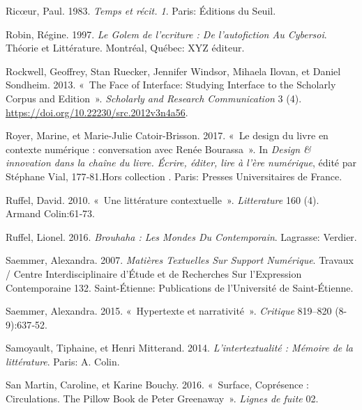 \begin{CSLReferences}{1}{0}
\leavevmode{}%
Ricœur, Paul. 1983. \emph{{Temps et r{é}cit. 1}}. {Paris}: {{É}ditions
du Seuil}.

\leavevmode{}%
Robin, Régine. 1997. \emph{Le {Golem} de l'ecriture : De l'autofiction
Au Cybersoi}. Th{é}orie et Litt{é}rature. {Montr{é}al, Qu{é}bec}: {XYZ
{é}diteur}.

\leavevmode{}%
Rockwell, Geoffrey, Stan Ruecker, Jennifer Windsor, Mihaela Ilovan, et
Daniel Sondheim. 2013. {«~The {Face} of {Interface}: {Studying
Interface} to the {Scholarly Corpus} and {Edition}~»}. \emph{Scholarly
and Research Communication} 3 (4).
\url{https://doi.org/10.22230/src.2012v3n4a56}.

\leavevmode{}%
Royer, Marine, et Marie-Julie Catoir-Brisson. 2017. {«~{Le design du
livre en contexte num{é}rique : conversation avec Ren{é}e Bourassa}~»}.
In \emph{{Design \& innovation dans la cha{î}ne du livre. {É}crire,
{é}diter, lire {à} l'{è}re num{é}rique}}, édité par Stéphane Vial,
177‑81.{{\guillemotleft}Hors collection {\guillemotright}}. {Paris}:
{Presses Universitaires de France}.

\leavevmode{}%
Ruffel, David. 2010. {«~{Une litt{é}rature contextuelle}~»}.
\emph{Litterature} 160 (4). {Armand Colin}:61‑73.

\leavevmode{}%
Ruffel, Lionel. 2016. \emph{Brouhaha : {Les} Mondes Du Contemporain}.
{Lagrasse}: {Verdier}.

\leavevmode{}%
Saemmer, Alexandra. 2007. \emph{Mati{è}res Textuelles Sur Support
Num{é}rique}. Travaux / {Centre Interdisciplinaire} d'{{É}tude} et de
{Recherches} Sur l'{Expression Contemporaine} 132. {Saint-{É}tienne}:
{Publications de l'Universit{é} de Saint-{É}tienne}.

\leavevmode{}%
Saemmer, Alexandra. 2015. {«~{Hypertexte et narrativit{é}}~»}.
\emph{Critique} 819--820 (8-9):637‑52.

\leavevmode{}%
Samoyault, Tiphaine, et Henri Mitterand. 2014.
\emph{{L'intertextualit{é} : M{é}moire de la litt{é}rature}}. {Paris}:
{A. Colin}.

\leavevmode{}%
San Martin, Caroline, et Karine Bouchy. 2016. {«~Surface, Copr{é}sence :
Circulations. {The Pillow Book} de {Peter Greenaway}~»}. \emph{Lignes de
fuite} 02.


\end{CSLReferences}
